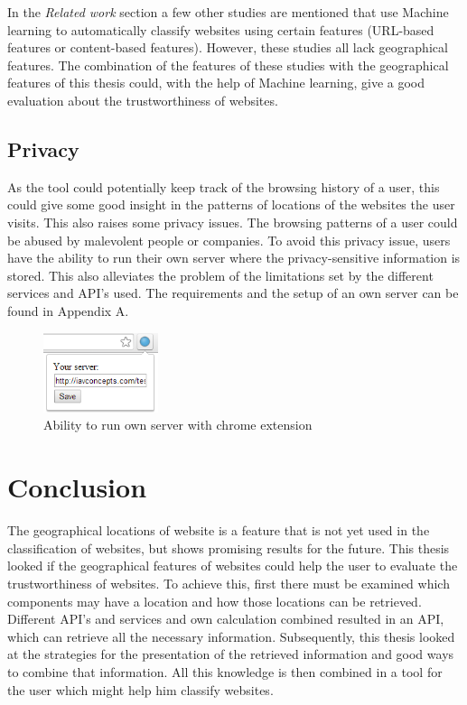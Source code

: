 \documentclass[twoside,openright,notitlepage]{uva-bachelor-thesis}
\begin{document}
In the \emph{Related work} section a few other studies are mentioned that use Machine learning to automatically classify websites using certain features (URL-based features or content-based features). However, these studies all lack geographical features. The combination of the features of these studies with the geographical features of this thesis could, with the help of Machine learning, give a good evaluation about the trustworthiness of websites.

\subsection{Privacy}
As the tool could potentially keep track of the browsing history of a user, this could give some good insight in the patterns of locations of the websites the user visits. This also raises some privacy issues. The browsing patterns of a user could be abused by malevolent people or companies. To avoid this privacy issue, users have the ability to run their own server where the privacy-sensitive information is stored. This also alleviates the problem of the limitations set by the different services and API's used. The requirements and the setup of an own server can be found in Appendix A.

\begin{figure}[h!]
    \centering
    \includegraphics[width=0.3\textwidth, center]{img/server.PNG}
    \caption{Ability to run own server with chrome extension}
    \label{fig:server}
\end{figure}

\FloatBarrier
\section{Conclusion}
The geographical locations of website is a feature that is not yet used in the classification of websites, but shows promising results for the future. This thesis looked if the geographical features of websites could help the user to evaluate the trustworthiness of websites. To achieve this, first there must be examined which components may have a location and how those locations can be retrieved. Different API's and services and own calculation combined resulted in an API, which can retrieve all the necessary information. Subsequently, this thesis looked at the strategies for the presentation of the retrieved information and good ways to combine that information. All this knowledge is then combined in a tool for the user which might help him classify websites. \\
\end{document}
